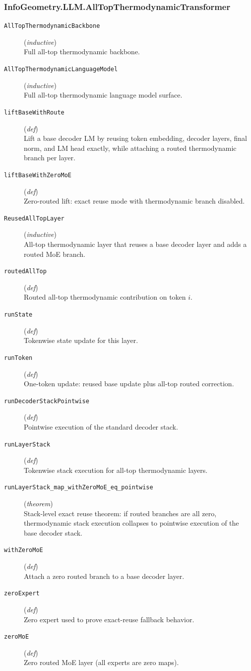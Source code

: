 \documentclass[11pt,a4paper]{article}
\begin{document}
\subsubsection*{InfoGeometry.LLM.AllTopThermodynamicTransformer}
\begin{description}
  \item[\texttt{AllTopThermodynamicBackbone}] (\textit{inductive}) \\ Full all-top thermodynamic backbone.
  \item[\texttt{AllTopThermodynamicLanguageModel}] (\textit{inductive}) \\ Full all-top thermodynamic language model surface.
  \item[\texttt{liftBaseWithRoute}] (\textit{def}) \\ Lift a base decoder LM by reusing token embedding, decoder layers, final norm, 
and LM head exactly, while attaching a routed thermodynamic branch per layer.
  \item[\texttt{liftBaseWithZeroMoE}] (\textit{def}) \\ Zero-routed lift: exact reuse mode with thermodynamic branch disabled.
  \item[\texttt{ReusedAllTopLayer}] (\textit{inductive}) \\ All-top thermodynamic layer that reuses a base decoder layer and adds a routed MoE branch.
  \item[\texttt{routedAllTop}] (\textit{def}) \\ Routed all-top thermodynamic contribution on token $i$.
  \item[\texttt{runState}] (\textit{def}) \\ Tokenwise state update for this layer.
  \item[\texttt{runToken}] (\textit{def}) \\ One-token update: reused base update plus all-top routed correction.
  \item[\texttt{runDecoderStackPointwise}] (\textit{def}) \\ Pointwise execution of the standard decoder stack.
  \item[\texttt{runLayerStack}] (\textit{def}) \\ Tokenwise stack execution for all-top thermodynamic layers.
  \item[\texttt{runLayerStack\_map\_withZeroMoE\_eq\_pointwise}] (\textit{theorem}) \\ Stack-level exact reuse theorem: 
if routed branches are all zero, thermodynamic stack execution collapses 
to pointwise execution of the base decoder stack.
  \item[\texttt{withZeroMoE}] (\textit{def}) \\ Attach a zero routed branch to a base decoder layer.
  \item[\texttt{zeroExpert}] (\textit{def}) \\ Zero expert used to prove exact-reuse fallback behavior.
  \item[\texttt{zeroMoE}] (\textit{def}) \\ Zero routed MoE layer (all experts are zero maps).
\end{description}
\end{document}
